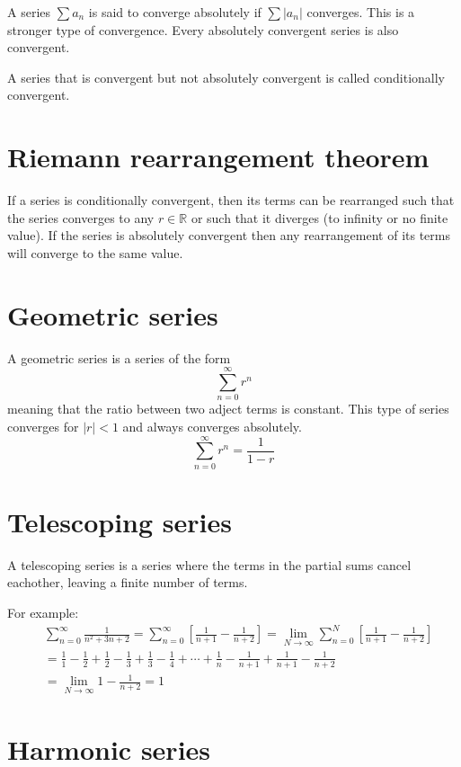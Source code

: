 \documentclass[a4paper]{article}
\begin{document}
A series \(\sum a_n\) is said to converge absolutely if
\(\sum |a_n|\) converges.
This is a stronger type of convergence. Every absolutely convergent series is also convergent.

A series that is convergent but not absolutely convergent is called conditionally convergent.

\section{Riemann rearrangement theorem}

If a series is conditionally convergent, then its terms can be rearranged such that
the series converges to any \(r\in \mathbb{R}\) or such that it diverges (to infinity or no finite value).
If the series is absolutely convergent then any rearrangement of its terms will converge to the same value.

\section{Geometric series}

A geometric series is a series of the form
\[
    \sum_{n=0}^\infty r^n
\]
meaning that the ratio between two adject terms is constant.
This type of series converges for \(|r| < 1\) and always converges absolutely.
\[
    \sum_{n=0}^\infty r^n = \frac{1}{1-r}
\]

\pagebreak

\section{Telescoping series}

A telescoping series is a series where the terms in the partial sums cancel eachother,
leaving a finite number of terms.

For example:
\begin{align*}
    &\sum_{n=0}^\infty \frac{1}{n^2 + 3n + 2}
    = \sum_{n=0}^\infty \left[ \frac{1}{n+1} - \frac{1}{n+2} \right]
    = \lim_{N \to \infty} \sum_{n=0}^N \left[ \frac{1}{n+1} - \frac{1}{n+2} \right] \\
    &= \frac{1}{1} - \frac{1}{2} + \frac{1}{2} - \frac{1}{3}
    + \frac{1}{3} - \frac{1}{4} + \cdots + \frac{1}{n} - \frac{1}{n+1} +
    \frac{1}{n+1} - \frac{1}{n+2} \\
    &= \lim_{N \to \infty} 1 - \frac{1}{n+2} = 1
\end{align*}

\section{Harmonic series}
\end{document}
